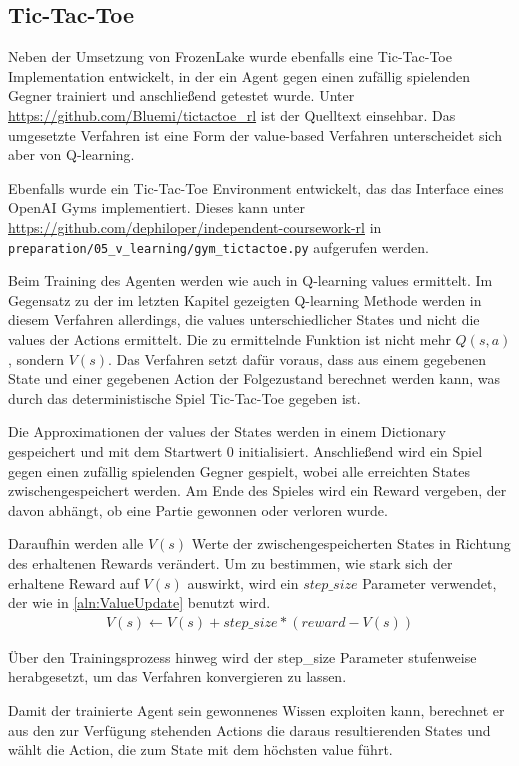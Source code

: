 \documentclass[11pt]{scrartcl}
\begin{document}
\newpage
\subsection{Tic-Tac-Toe}
Neben der Umsetzung von FrozenLake wurde ebenfalls eine Tic-Tac-Toe Implementation
entwickelt, in der ein Agent gegen einen zufällig spielenden Gegner trainiert und
anschließend getestet wurde. Unter \url{https://github.com/Bluemi/tictactoe_rl} ist
der Quelltext einsehbar. Das umgesetzte Verfahren ist eine Form der value-based
Verfahren unterscheidet sich aber von Q-learning.

Ebenfalls wurde ein Tic-Tac-Toe Environment entwickelt, das das Interface eines OpenAI
Gyms implementiert. Dieses kann unter
\url{https://github.com/dephiloper/independent-coursework-rl} in
\lstinline!preparation/05_v_learning/gym_tictactoe.py! aufgerufen werden.

Beim Training des Agenten werden wie auch in Q-learning values ermittelt. Im Gegensatz zu
der im letzten Kapitel gezeigten Q-learning Methode werden in diesem Verfahren allerdings,
die values unterschiedlicher States und nicht die values der Actions ermittelt. Die zu
ermittelnde Funktion ist nicht mehr $Q(s, a)$, sondern $V(s)$. Das Verfahren setzt dafür
voraus, dass aus einem gegebenen State und einer gegebenen Action der Folgezustand berechnet
werden kann, was durch das deterministische Spiel Tic-Tac-Toe gegeben ist.

Die Approximationen der values der States werden in einem Dictionary gespeichert und mit
dem Startwert 0 initialisiert. Anschließend wird ein Spiel gegen einen zufällig spielenden
Gegner gespielt, wobei alle erreichten States zwischengespeichert werden. Am Ende des
Spieles wird ein Reward vergeben, der davon abhängt, ob eine Partie gewonnen oder verloren
wurde.

Daraufhin werden alle $V(s)$ Werte der zwischengespeicherten States in Richtung des
erhaltenen Rewards verändert. Um zu bestimmen, wie stark sich der erhaltene Reward auf
$V(s)$ auswirkt, wird ein $step\_size$ Parameter verwendet, der wie in
\autoref{aln:ValueUpdate} benutzt wird.
\begin{align}
  V(s) \leftarrow V(s) + step\_size * (reward - V(s))
  \label{aln:ValueUpdate}
\end{align}
\noindent

Über den Trainingsprozess hinweg wird der step\_size Parameter stufenweise herabgesetzt,
um das Verfahren konvergieren zu lassen.

Damit der trainierte Agent sein gewonnenes Wissen exploiten kann, berechnet er aus den
zur Verfügung stehenden Actions die daraus resultierenden States und wählt die Action, die
zum State mit dem höchsten value führt.
\end{document}
